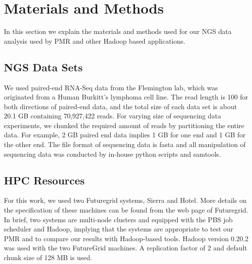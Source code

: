 \documentclass{acm_proc_article-sp}
\begin{document}

\section{Materials and Methods}\label{sec:materials_and_methods} 
In this section we explain the materials and methods used for our NGS data analysis used by PMR and other Hadoop based applications.

\subsection{NGS Data Sets}
We used paired-end RNA-Seq data from the Flemington lab, which was originated from a Human Burkitt's lymphoma cell line\cite{erik_2010}. The read length is 100 for both directions of paired-end data, and the total size of each data set is about 20.1 GB containing 70,927,422 reads.  For varying size of sequencing data experiments, we chunked the required amount of reads by partitioning the entire data.  For example, 2 GB paired end data implies 1 GB for one end and 1 GB for the other end.  The file format of sequencing data is fasta and all manipulation of sequencing data was conducted by in-house python scripts and samtools\cite{samtools}.  

\subsection{HPC Resources}
For this work, we used two Futuregrid systems, Sierra and Hotel.  More details on the specification of these machines can be found from the web page of Futuregrid\cite{futuregrid_url}.  In brief, two systems are multi-node clusters and equipped with the PBS job scheduler and Hadoop, implying that the systems are appropriate to test our PMR and to compare our results with Hadoop-based tools. Hadoop version 0.20.2 was used with the two FutureGrid machines. A replication factor of 2 and default chunk size of 128 MB is used. 
\end{document}

